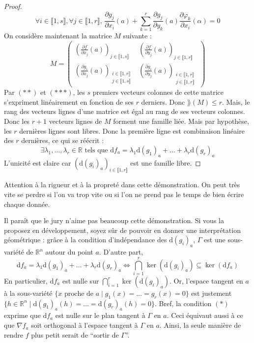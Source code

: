 \begin{proof}
    \[ \forall i \in \llbracket 1, s \rrbracket, \forall j \in \llbracket 1, r \rrbracket, \, \frac{\partial g_j}{\partial x_i}(a) + \sum_{k=1}^r \frac{\partial g_j}{\partial y_k}(a) \frac{\partial \varphi_k}{\partial x_i}(\alpha) = 0 \tag{$***$} \]
    On considère maintenant la matrice $M$ suivante :
    \[ M = \begin{pmatrix}
      \left( \frac{\partial f}{\partial x_j}(a) \right)_{j \in \llbracket 1, s \rrbracket} & \left( \frac{\partial f}{\partial y_j}(a) \right)_{j \in \llbracket 1, r \rrbracket} \\
      \left( \frac{\partial g_i}{\partial x_j}(a) \right)_{\substack{i \in \llbracket 1, r \rrbracket \\ j \in \llbracket 1, s \rrbracket}} & \left( \frac{\partial g_i}{\partial y_j}(a) \right)_{\substack{i \in \llbracket 1, r \rrbracket \\ j \in \llbracket 1, r \rrbracket}}
    \end{pmatrix} \]
    Par $(**)$ et $(***)$, les $s$ premiers vecteurs colonnes de cette matrice s'expriment linéairement en fonction de ses $r$ derniers. Donc $\rang (M) \leq r$. Mais, le rang des vecteurs lignes d'une matrice est égal au rang de ses vecteurs colonnes. Donc les $r+1$ vecteurs lignes de $M$ forment une famille liée. Mais par hypothèse, les $r$ dernières lignes sont libres. Donc la première ligne est combinaison linéaire des $r$ dernières, ce qui se réécrit :
    \[ \exists \lambda_1, \dots, \lambda_r \in \mathbb{R} \text{ tels que } \mathrm{d}f_a = \lambda_1 \mathrm{d}(g_1)_a + \dots + \lambda_r \mathrm{d}(g_r)_a \]
    L'unicité est claire car $(\mathrm{d}(g_i)_a)_{i \in \llbracket 1, r \rrbracket}$ est une famille libre.
  \end{proof}

  Attention à la rigueur et à la propreté dans cette démonstration. On peut très vite se perdre si l'on va trop vite ou si l'on ne prend pas le temps de bien écrire chaque donnée.


  \begin{remark}
    Il paraît que le jury n'aime pas beaucoup cette démonstration. Si vous la proposez en développement, soyez sûr de pouvoir en donner une interprétation géométrique : grâce à la condition d'indépendance des $\mathrm{d}(g_i)_a$, $\Gamma$ est une sous-variété de $\mathbb{R}^n$ autour du point $a$. D'autre part,
    \[ \mathrm{d}f_a = \lambda_1 \mathrm{d}(g_1)_a + \dots + \lambda_r \mathrm{d}(g_r)_a \iff \bigcap_{i=1}^r \ker(\mathrm{d}(g_i)_a) \subseteq \ker(\mathrm{d}f_a) \tag{$*$} \]
    En particulier, $\mathrm{d}f_a$ est nulle sur $\bigcap_{i=1}^r \ker(\mathrm{d}(g_i)_a)$. Or, l'espace tangent en $a$ à la sous-variété $\{ x \text{ proche de } a \mid g_1(x) = \dots = g_r(x) = 0 \}$ est justement $\{ h \in \mathbb{R}^n \mid \mathrm{d}(g_1)_a(h) = \dots = \mathrm{d}(g_r)_a(h) = 0 \}$.
    \newpar
    Bref, la condition $(*)$ exprime que $\mathrm{d}f_a$ est nulle sur le plan tangent à $\Gamma$ en $a$. Ceci équivaut aussi à ce que $\nabla f_a$ soit orthogonal à l'espace tangent à $\Gamma$ en $a$. Ainsi, la seule manière de rendre $f$ plus petit serait de ``sortir de $\Gamma$''.
  \end{remark}

